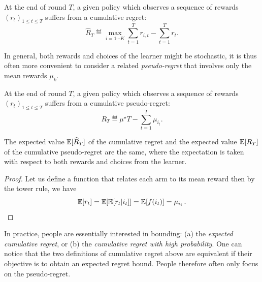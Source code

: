 \begin{definition}\label{def:mab.cumulative_regret}
\begin{leftbar}[defnbar]
	At the end of round $T$, a given policy which observes a sequence of rewards $(r_t)_{1 \leq t \leq T}$ suffers from a cumulative regret:
	\[
		\hat{R}_T \eqdef \max_{i=1\cdots K} \sum_{t=1}^T r_{i,t} - \sum_{t=1}^T r_t.
	\]
\end{leftbar}
\end{definition}

In general, both rewards and choices of the learner might be stochastic, it is thus often more convenient to consider a related \emph{pseudo-regret} that involves only the mean rewards $\mu_k$.

\begin{definition}\label{def:mab.pseudo_regret}
\begin{leftbar}[defnbar]
	At the end of round $T$, a given policy which observes a sequence of rewards $(r_t)_{1 \leq t \leq T}$ suffers from a cumulative pseudo-regret:
	\[
		R_T \eqdef \mu^{\star}T - \sum_{t=1}^T \mu_{i_t}.
	\]
\end{leftbar}
\end{definition}

\begin{proposition}\label{prop:mab.pseudo_regret}
\begin{leftbar}[propositionbar]
	The expected value $\mathbb{E}[\widehat{R}_T]$ of the cumulative regret and the expected value $\mathbb{E}[R_T]$ of the cumulative pseudo-regret are the same, where the expectation is taken with respect to both rewards and choices from the learner.
\end{leftbar}
\end{proposition}

\begin{proof}
	Let us define a function that relates each arm to its mean reward  then by the tower rule, we have
    \[
	    \mathbb{E}[r_t] = \mathbb{E}[\mathbb{E}[r_t|i_t]] = \mathbb{E}[f(i_t)] = \mu_{i_t}\,.
    \]
\end{proof}

In practice, people are essentially interested in bounding: (a) the \emph{expected cumulative regret}, or (b) the \emph{cumulative regret with high probability}. One can notice that the two definitions of cumulative regret above are equivalent if their objective is to obtain an expected regret bound. People therefore often only focus on the pseudo-regret.

